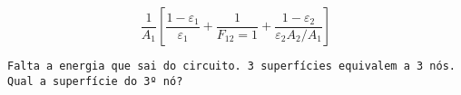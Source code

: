 

\[\frac{1}{A_{1}} \left[  \frac{1-\varepsilon_{1}}{\varepsilon_{1}} + \frac{1}{F_{12}=1  } + \frac{1-\varepsilon _{2}}{\varepsilon _{2} A_{2}/A_{1}} \right]\]

\begin{verbatim}
Falta a energia que sai do circuito. 3 superfícies equivalem a 3 nós. 
Qual a superfície do 3º nó?
\end{verbatim}